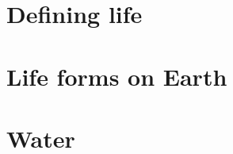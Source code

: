 \documentclass[DIV=calc, paper=a4, fontsize=12pt]{scrartcl}	 %
\begin{document}
\section{Defining life}

\begin{multicols}{2}



\end{multicols}

\noindent\makebox[\linewidth]{\rule{\textwidth}{0.4pt}}

\section{Life forms on Earth}

\begin{multicols}{2}



\end{multicols} \noindent\makebox[\linewidth]{\rule{\textwidth}{0.4pt}}


\section{Water}

\begin{multicols}{2}



\end{multicols} \noindent\makebox[\linewidth]{\rule{\textwidth}{0.4pt}}






%
\end{document}
